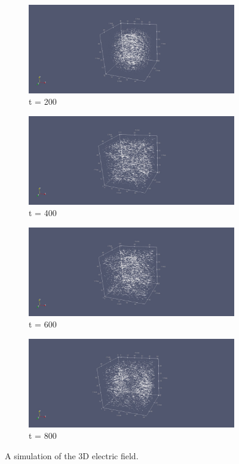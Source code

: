 \begin{figure}[h!]
	\centering
	\begin{subfigure}{.49\textwidth}
		\centering
		\includegraphics[width=.95\linewidth]{Figures/FDTD3DE1}
		\caption{t = 200}
	\end{subfigure}
	\begin{subfigure}{.49\textwidth}
		\centering
		\includegraphics[width=.95\linewidth]{Figures/FDTD3DE2}
		\caption{t = 400}
	\end{subfigure}
	\begin{subfigure}{.49\textwidth}
		\centering
		\includegraphics[width=.95\linewidth]{Figures/FDTD3DE3}
		\caption{t = 600}
	\end{subfigure}
	\begin{subfigure}{.49\textwidth}
		\centering
		\includegraphics[width=.95\linewidth]{Figures/FDTD3DE4}
		\caption{t = 800}
	\end{subfigure}
	\decoRule
	\caption[3D Electric Field Simulation]{A simulation of the 3D electric field.}
	\label{fig:FDTD3DE}
\end{figure}

